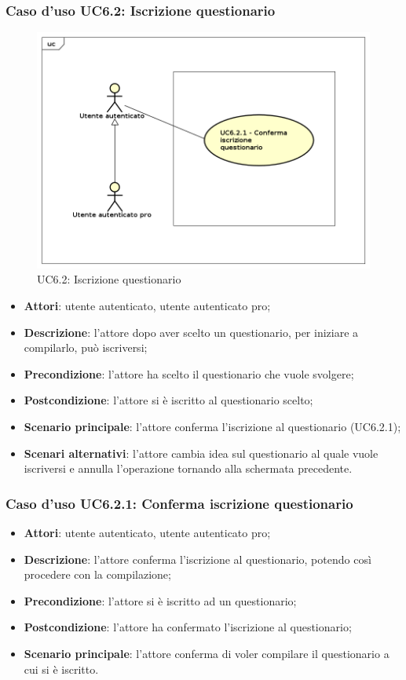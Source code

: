 \subsubsection{Caso d'uso UC6.2: Iscrizione questionario}
\label{UC6.2}
\begin{figure}[h]
\centering
\includegraphics[scale=0.5,keepaspectratio]{UML/UC6_2.png}
\caption{UC6.2: Iscrizione questionario}
\end{figure}
\FloatBarrier
\begin{itemize}
\item\textbf{Attori}: utente autenticato, utente autenticato pro;
\item\textbf{Descrizione}: l'attore dopo aver scelto un questionario, per iniziare a compilarlo, può iscriversi;
\item\textbf{Precondizione}: l'attore ha scelto il questionario che vuole svolgere;
\item\textbf{Postcondizione}: l'attore si è iscritto al questionario scelto;
\item\textbf{Scenario principale}: l'attore conferma l'iscrizione al questionario (UC6.2.1);
\item\textbf{Scenari alternativi}: l'attore cambia idea sul questionario al quale vuole iscriversi e annulla l'operazione tornando alla schermata precedente.
\end{itemize}

\subsubsection{Caso d'uso UC6.2.1: Conferma iscrizione questionario}
\label{UC6.2.1}
\begin{itemize}
\item\textbf{Attori}: utente autenticato, utente autenticato pro;
\item\textbf{Descrizione}: l'attore conferma l'iscrizione al questionario, potendo così procedere con la compilazione;
\item\textbf{Precondizione}: l'attore si è iscritto ad un questionario;
\item\textbf{Postcondizione}: l'attore ha confermato l'iscrizione al questionario;
\item\textbf{Scenario principale}: l'attore conferma di voler compilare il questionario a cui si è iscritto.
\end{itemize}

